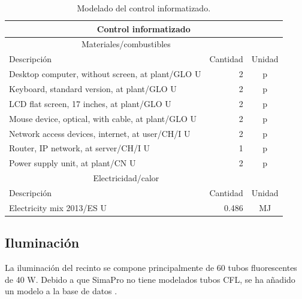 \begin{table}[!htb]
\centering
\begin{tabular}{p{8cm}rc}
\toprule
\multicolumn{3}{c}{Control informatizado}\\
\midrule
\multicolumn{2}{c}{Materiales/combustibles}\\
\cmidrule(r){1-2}
Descripción & Cantidad & Unidad\\
\midrule
Desktop computer, without screen, at plant/GLO U & 2 & p\\
Keyboard, standard version, at plant/GLO U & 2 & p\\
LCD flat screen, 17 inches, at plant/GLO U & 2 & p\\
Mouse device, optical, with cable, at plant/GLO U & 2 & p\\
Network access devices, internet, at user/CH/I U & 2 & p\\
Router, IP network, at server/CH/I U & 1 & p\\
Power supply unit, at plant/CN U & 2 & p\\
\midrule
\multicolumn{2}{c}{Electricidad/calor}\\
\cmidrule(r){1-2}
Descripción & Cantidad & Unidad\\
\midrule
Electricity mix 2013/ES U & 0.486 & \si{MJ}\\
\bottomrule
\end{tabular}
\caption{Modelado del control informatizado.}
\label{modeladodecontrol}
\end{table}


\subsection{Iluminación}

La iluminación del recinto se compone principalmente de 60 tubos fluorescentes de 40 \si{W}. Debido a que SimaPro no tiene modelados tubos CFL, se ha añadido un modelo a la base de datos \cite{cflbulb}.

